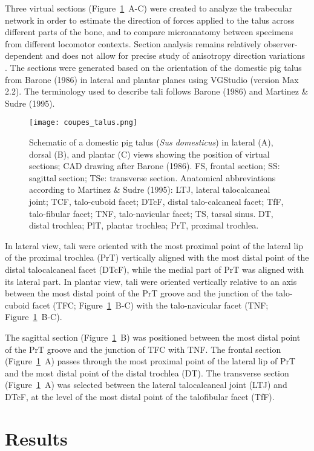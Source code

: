\documentclass[12pt,a4paper]{article}
\begin{document}
Three virtual sections (Figure~\ref{coupes_talus}~A-C) were created to analyze the trabecular network in order to estimate the direction of forces applied to the talus across different parts of the bone, and to compare microanatomy between specimens from different locomotor contexts. Section analysis remains relatively observer-dependent and does not allow for precise study of anisotropy direction variations \cite{reznikovTechnicalNoteMapping2022d}. The sections were generated based on the orientation of the domestic pig talus from Barone (1986) in lateral and plantar planes using VGStudio (version Max 2.2). The terminology used to describe tali follows Barone (1986) and Martinez \& Sudre (1995).
\begin{figure}[H]
	\texttt{[image: coupes\_talus.png]}
	\caption{Schematic of a domestic pig talus (\textit{Sus domesticus}) in lateral (A), dorsal (B), and plantar (C) views showing the position of virtual sections; CAD drawing after Barone (1986). 
FS, frontal section; SS: sagittal section; TSe: transverse section. Anatomical abbreviations according to Martinez \& Sudre (1995): 
LTJ, lateral talocalcaneal joint; TCF, talo-cuboid facet; DTcF, distal talo-calcaneal facet; TfF, talo-fibular facet; 
TNF, talo-navicular facet; TS, tarsal sinus. DT, distal trochlea; PlT, plantar trochlea; PrT, proximal trochlea.}
	\label{coupes_talus}
\end{figure}
In lateral view, tali were oriented with the most proximal point of the lateral lip of the proximal trochlea (PrT) vertically aligned with the most distal point of the distal talocalcaneal facet (DTcF), while the medial part of PrT was aligned with its lateral part. In plantar view, tali were oriented vertically relative to an axis between the most distal point of the PrT groove and the junction of the talo-cuboid facet (TFC; Figure~\ref{coupes_talus}~B-C) with the talo-navicular facet (TNF; Figure~\ref{coupes_talus}~B-C).

The sagittal section (Figure~\ref{coupes_talus}~B) was positioned between the most distal point of the PrT groove and the junction of TFC with TNF. The frontal section (Figure~\ref{coupes_talus}~A) passes through the most proximal point of the lateral lip of PrT and the most distal point of the distal trochlea (DT). The transverse section (Figure~\ref{coupes_talus}~A) was selected between the lateral talocalcaneal joint (LTJ) and DTcF, at the level of the most distal point of the talofibular facet (TfF).
\section{Results}
\end{document}
